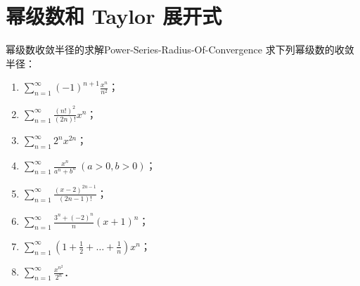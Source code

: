 \section{幂级数和 Taylor 展开式}

\begin{problem}{幂级数收敛半径的求解}{Power-Series-Radius-Of-Convergence}
    求下列幂级数的收敛半径：
    \begin{enumerate}
        \item $\sum_{n=1}^\infty (-1)^{n+1}\frac{x^n}{n^2}$；
        \item $\sum_{n=1}^\infty \frac{(n!)^2}{(2n)!} x^n$；
        \item $\sum_{n=1}^\infty 2^n x^{2n}$；
        \item $\sum_{n=1}^\infty \frac{x^n}{a^n + b^n} \ (a > 0, b > 0)$；
        \item $\sum_{n=1}^\infty \frac{(x - 2)^{2n-1}}{(2n - 1)!}$；
        \item $\sum_{n=1}^\infty \frac{3^n + (-2)^n}{n}(x + 1)^n$；
        \item $\sum_{n=1}^\infty \left(1 + \frac{1}{2} + \dots + \frac{1}{n}\right) x^n$；
        \item $\sum_{n=1}^\infty \frac{x^{n^2}}{2^n}$．
    \end{enumerate}
\end{problem}


